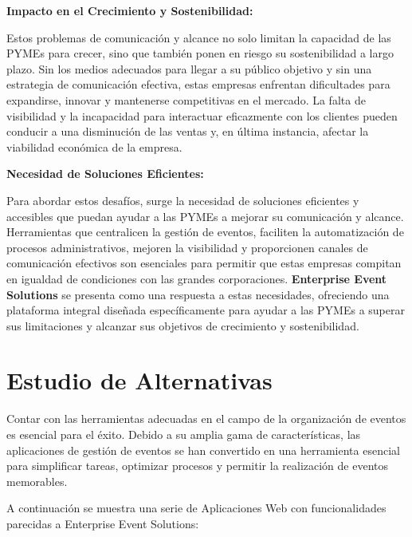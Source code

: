 \textbf{Impacto en el Crecimiento y Sostenibilidad:}

Estos problemas de comunicación y alcance no solo limitan la capacidad de las PYMEs para crecer, sino que también ponen en riesgo su sostenibilidad 
a largo plazo. Sin los medios adecuados para llegar a su público objetivo y sin una estrategia de comunicación efectiva, estas empresas enfrentan 
dificultades para expandirse, innovar y mantenerse competitivas en el mercado. La falta de visibilidad y la incapacidad para interactuar eficazmente 
con los clientes pueden conducir a una disminución de las ventas y, en última instancia, afectar la viabilidad económica de la empresa.

\textbf{Necesidad de Soluciones Eficientes:}

Para abordar estos desafíos, surge la necesidad de soluciones eficientes y accesibles que puedan ayudar a las PYMEs a mejorar su comunicación y alcance. 
Herramientas que centralicen la gestión de eventos, faciliten la automatización de procesos administrativos, mejoren la visibilidad y proporcionen canales 
de comunicación efectivos son esenciales para permitir que estas empresas compitan en igualdad de condiciones con las grandes corporaciones. 
\textbf{Enterprise Event Solutions} se presenta como una respuesta a estas necesidades, ofreciendo una plataforma integral diseñada específicamente 
para ayudar a las PYMEs a superar sus limitaciones y alcanzar sus objetivos de crecimiento y sostenibilidad.


\section{Estudio de Alternativas}
Contar con las herramientas adecuadas en el campo de la organización de eventos es esencial para el éxito. Debido a su amplia gama de características, 
las aplicaciones de gestión de eventos se han convertido en una herramienta esencial para simplificar tareas, optimizar procesos y 
permitir la realización de eventos memorables.

A continuación se muestra una serie de Aplicaciones Web con funcionalidades parecidas a Enterprise Event Solutions:

